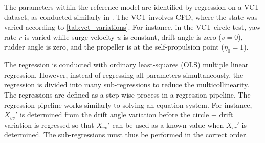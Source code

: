 The parameters within the reference model are identified by regression on a VCT dataset, as conducted similarly in \citet{marimon_giovannetti_effects_2020}. The VCT involves CFD, where the state was varied according to \autoref{tab:vct_variations}. For instance, in the VCT circle test, yaw rate $r$ is varied while surge velocity $u$ is constant, drift angle is zero ($v=0$), rudder angle is zero, and the propeller is at the self-propulsion point ($\eta_0=1$).

The regression is conducted with ordinary least-squares (OLS) multiple linear regression. However, instead of regressing all parameters simultaneously, the regression is divided into many sub-regressions to reduce the multicollinearity. The regressions are defined as a step-wise process in a regression pipeline. 
The regression pipeline works similarly to solving an equation system. For instance, ${X_{vv}}'$ is determined from the drift angle variation before the circle + drift variation is regressed so that ${X_{vv}}'$ can be used as a known value when ${X_{vr}}'$ is determined. The sub-regressions must thus be performed in the correct order. 

